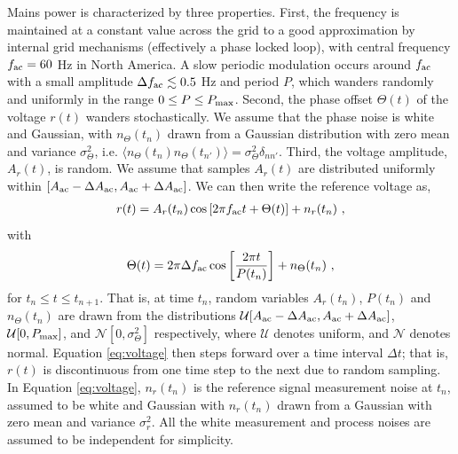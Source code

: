 \documentclass[pra,superscriptaddress,reprint,amsmath,amssymb,nofootinbib]{revtex4-2}
\begin{document}
 
 Mains power is characterized by three properties. First, the frequency is maintained at a constant value across the grid to a good approximation by internal grid mechanisms (effectively a phase locked loop), with central frequency $f_{\rm ac} = 60$ Hz in North America. A slow periodic modulation occurs around $f_{\rm ac}$ with a small amplitude $\Delta f_{\rm ac} \lesssim 0.5$ Hz and period $P$, which wanders randomly and uniformly in the range $0 \leq P \leq P_{\rm max}$. Second, the phase offset $\Theta(t)$ of the voltage $r(t)$ wanders stochastically. We assume that the phase noise is white and Gaussian, with $n_{\Theta}(t_n)$ drawn from a Gaussian distribution with zero mean and variance $\sigma_{\Theta}^2$, i.e. $\langle n_{\Theta} (t_n) n_{\Theta} (t_{n'})\rangle = \sigma^2_{\Theta} \delta_{n n'}$. Third, the voltage amplitude, $A_r(t)$, is random. We assume that samples $A_r(t)$ are distributed uniformly within $[A_{\rm ac} - \Delta A_{\rm ac} , A_{\rm ac} + \Delta A_{\rm ac}]$. We can then write the reference voltage as,
 \begin{eqnarray}
 	r(t) = A_r(t_n) \cos \left[ 2 \pi f_{\rm ac} t + \Theta(t)\right] +n_r(t_n) \ ,
 	\label{eq:voltage}
 \end{eqnarray}
with
 \begin{eqnarray}
\Theta(t) = 2 \pi \Delta f_{\rm ac} \cos\left[\frac{2 \pi t}{P(t_n)}\right] + n_{\Theta} (t_n) \ ,
\label{eq:voltage_theta}
\end{eqnarray}
for $t_n \leq t \leq t_{n+1}$. That is, at time $t_n$, random variables $A_r(t_n)$, $P(t_n)$ and $n_{\Theta} (t_n)$ are drawn from the distributions $\mathcal{U}[A_{\rm ac} - \Delta A_{\rm ac},A_{\rm ac} + \Delta A_{\rm ac} ]$, $\mathcal{U}[0, P_{\rm max}]$, and $\mathcal{N} [0, \sigma_{\Theta}^2]$ respectively, where $\mathcal{U}$ denotes uniform, and $\mathcal{N}$ denotes normal. Equation \eqref{eq:voltage} then steps forward over a time interval $\Delta t$; that is, $r(t)$ is discontinuous from one time step to the next due to random sampling. In Equation \eqref{eq:voltage}, $n_r(t_n)$ is the reference signal measurement noise at $t_n$, assumed to be white and Gaussian with $n_r(t_n)$ drawn from a Gaussian with zero mean and variance $\sigma_r^2$. All the white measurement and process noises are assumed to be independent for simplicity. \newline 
\end{document}

